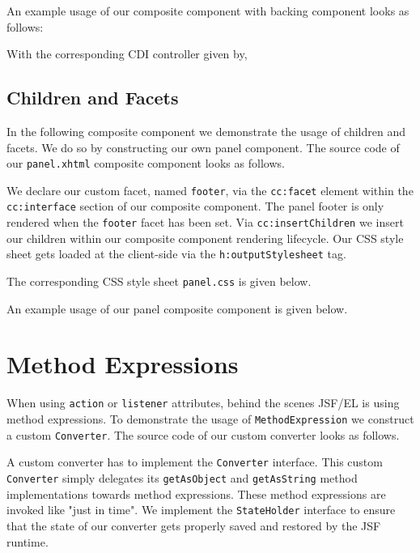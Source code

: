 An example usage of our composite component with backing component looks as follows:

With the corresponding CDI controller given by,


\subsection{Children and Facets}
In the following composite component we demonstrate the usage of children and facets.
We do so by constructing our own panel component.
The source code of our \texttt{panel.xhtml} composite component looks as follows.

We declare our custom facet, named \texttt{footer},
via the \texttt{cc:facet} element within the \texttt{cc:interface} section of our composite component.
The panel footer is only rendered when the \texttt{footer} facet has been set.
Via \texttt{cc:insertChildren} we insert our children within our composite component rendering lifecycle.
Our CSS style sheet gets loaded at the client-side via the \texttt{h:outputStylesheet} tag.

The corresponding CSS style sheet \texttt{panel.css} is given below.


An example usage of our panel composite component is given below.


\section{Method Expressions}
When using \texttt{action} or \texttt{listener} attributes, behind the scenes JSF/EL is using method expressions.
To demonstrate the usage of \texttt{MethodExpression} we construct a custom \texttt{Converter}.
The source code of our custom converter looks as follows.

A custom converter has to implement the \texttt{Converter} interface.
This custom \texttt{Converter} simply delegates its \texttt{getAsObject} and \texttt{getAsString} method implementations towards method expressions.
These method expressions are invoked like "just in time".
We implement the \texttt{StateHolder} interface to ensure that the state of our converter gets properly saved and restored by the JSF runtime.

